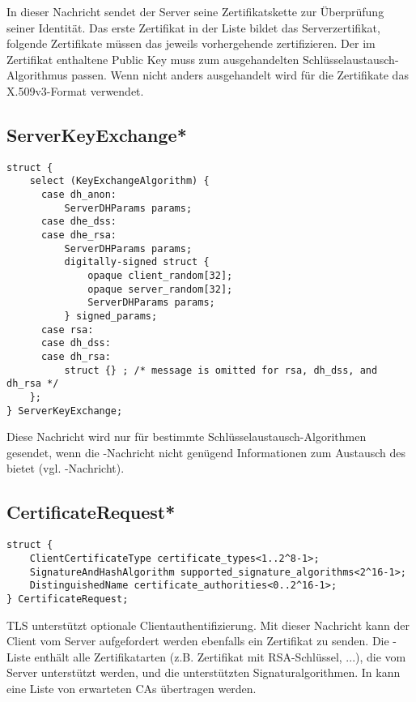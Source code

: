 In dieser Nachricht sendet der Server seine Zertifikatskette zur Überprüfung seiner Identität. Das erste Zertifikat in der Liste bildet das Serverzertifikat, folgende Zertifikate müssen das jeweils vorhergehende zertifizieren. Der im Zertifikat enthaltene Public Key muss zum ausgehandelten Schlüsselaustausch-Algorithmus passen. Wenn nicht anders ausgehandelt wird für die Zertifikate das X.509v3-Format verwendet.

\subsection*{ServerKeyExchange*}

\begin{lstlisting}
struct {
	select (KeyExchangeAlgorithm) {
	  case dh_anon:
	      ServerDHParams params;
	  case dhe_dss:
	  case dhe_rsa:
	      ServerDHParams params;
	      digitally-signed struct {
	          opaque client_random[32];
	          opaque server_random[32];
	          ServerDHParams params;
	      } signed_params;
	  case rsa:
	  case dh_dss:
	  case dh_rsa:
	      struct {} ; /* message is omitted for rsa, dh_dss, and dh_rsa */
	};
} ServerKeyExchange;
\end{lstlisting}

Diese Nachricht wird nur für bestimmte Schlüsselaustausch-Algorithmen gesendet, wenn die \servercertificate{}-Nachricht nicht genügend Informationen zum Austausch des \premastersecret{} bietet (vgl. \clientkeyexchange{}-Nachricht).

\subsection*{CertificateRequest*}

\begin{lstlisting}
struct {
	ClientCertificateType certificate_types<1..2^8-1>;
	SignatureAndHashAlgorithm supported_signature_algorithms<2^16-1>;
	DistinguishedName certificate_authorities<0..2^16-1>;
} CertificateRequest;
\end{lstlisting}

TLS unterstützt optionale Clientauthentifizierung. Mit dieser Nachricht kann der Client vom Server aufgefordert werden ebenfalls ein Zertifikat zu senden. Die -Liste enthält alle Zertifikatarten (z.B. Zertifikat mit RSA-Schlüssel, ...), die vom Server unterstützt werden, und  die unterstützten Signaturalgorithmen. In  kann eine Liste von erwarteten CAs übertragen werden.

